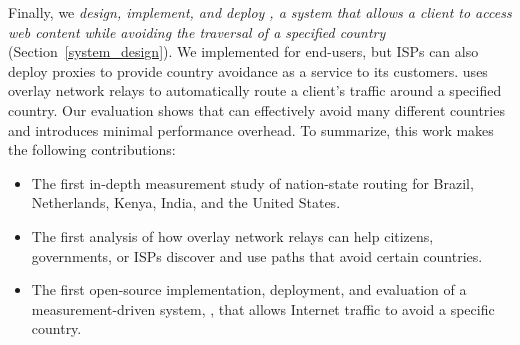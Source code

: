 Finally, we {\em design, implement, and deploy \system{}, a system that allows
a client to access web content while avoiding the traversal of a specified
country} (Section~\ref{system_design}).  We implemented \system{} for
end-users, 
but ISPs can also deploy \system{} proxies to provide country
avoidance as a service to its customers.  \system{} uses overlay
network relays to automatically route a client's traffic around a specified
country.  %
Our evaluation
shows that \system{} can effectively avoid many different countries and
introduces minimal performance overhead.  To summarize, this work makes the following
contributions:

\begin{itemize}
\item The first in-depth measurement study of nation-state routing
for Brazil, Netherlands, Kenya, India, and the United
States.
\item The first analysis of how overlay network relays can help citizens, governments,
or ISPs
discover and use paths that avoid certain countries.
\item The first open-source implementation, deployment, and evaluation of a measurement-driven
system, \system{}, that allows Internet traffic to avoid a specific country.
\end{itemize}
